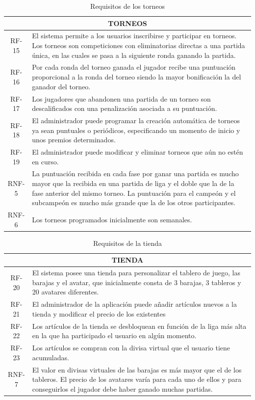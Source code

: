 \begin{table}[H]
\centering
\begin{tabular}{|c|p{12cm}|}
\hline
\multicolumn{2}{|c|}{TORNEOS} \\ \hline
RF-15 & El sistema permite a los usuarios inscribirse y participar en torneos. Los torneos son competiciones con eliminatorias directas a una partida única, en las cuales se pasa a la siguiente ronda ganando la partida. \\ \hline
RF-16 & Por cada ronda del torneo ganada el jugador recibe una puntuación proporcional a la ronda del torneo siendo la mayor bonificación la del ganador del torneo. \\ \hline
RF-17 & Los jugadores que abandonen una partida de un torneo son descalificados con una penalización asociada a su puntuación. \\ \hline
RF-18 & El administrador puede programar la creación automática de torneos ya sean puntuales o periódicos, especificando un momento de inicio y unos premios determinados. \\ \hline
RF-19 & El administrador puede modificar y eliminar torneos que aún no estén en curso. \\ \hline
RNF-5 & La puntuación recibida en cada fase por ganar una partida es mucho mayor que la recibida en una partida de liga y el doble que la de la fase anterior del mismo torneo. La puntuación para el campeón y el subcampeón es mucho más grande que la de los otros participantes. \\ \hline
RNF-6 & Los torneos programados inicialmente son semanales. \\ \hline
\end{tabular}
\caption{Requisitos de los torneos}
\label{tabla-torneo}
\end{table}

\begin{table}[H]
\centering
\label{tabla-tienda}
\begin{tabular}{|c|p{12cm}|}
\hline
\multicolumn{2}{|c|}{TIENDA} \\ \hline
RF-20 & El sistema posee una tienda para personalizar el tablero de juego, las barajas y el avatar, que inicialmente consta de 3 barajas, 3 tableros y 20 avatares diferentes. \\ \hline
RF-21 & El administrador de la aplicación puede añadir artículos nuevos a la tienda y modificar el   precio de los existentes \\ \hline
RF-22 & Los artículos de la tienda se desbloquean en función de la liga más alta en la que ha participado el usuario en algún momento. \\ \hline
RF-23 & Los artículos se compran con la divisa virtual que el usuario tiene acumuladas. \\ \hline
RNF-7 & El valor en divisas virtuales de las barajas es más mayor que el de los tableros. El precio de los avatares varía para cada uno de ellos y para conseguirlos el jugador debe haber ganado muchas partidas. \\ \hline
\end{tabular}
\caption{Requisitos de la tienda}
\end{table}


